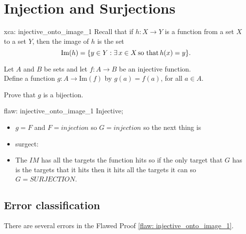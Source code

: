 \section{Injection and Surjections}

\begin{xca}{xca: injective_onto_image_1}
Recall that if $h: X \rightarrow Y$ is a function from a set $X$ to a set $Y$, then the image of $h$ is the set 
\[\operatorname{Im}(h) = \{ y \in Y : \exists\, x \in X\, \text{so that}\, h(x) = y \}. \]

\noindent Let $A$ and $B$ be sets and let $f: A \to B$ be an injective function.\\ Define a function $g:A \to \text{Im}(f)$ by $g(a) = f(a)$, for all $a \in A$.

\noindent Prove that $g$ is a bijection. 
\end{xca}

\begin{flaw}{flaw: injective_onto_image_1} 
Injective;
\begin{itemize}
    \item $g=F$ and $F = injection$ so $G = injection$ so the next thing is


\item surgect:

    \item The $IM$ has all the targets the function hits so if the only target that $G$ has is the targets that it hits then it hits all the targets it can so $G = SURJECTION$. 
\end{itemize}
\end{flaw}

\clearpage
\subsection{Error classification}



There are several errors
 in the Flawed Proof \ref{flaw: injective_onto_image_1}.
 
